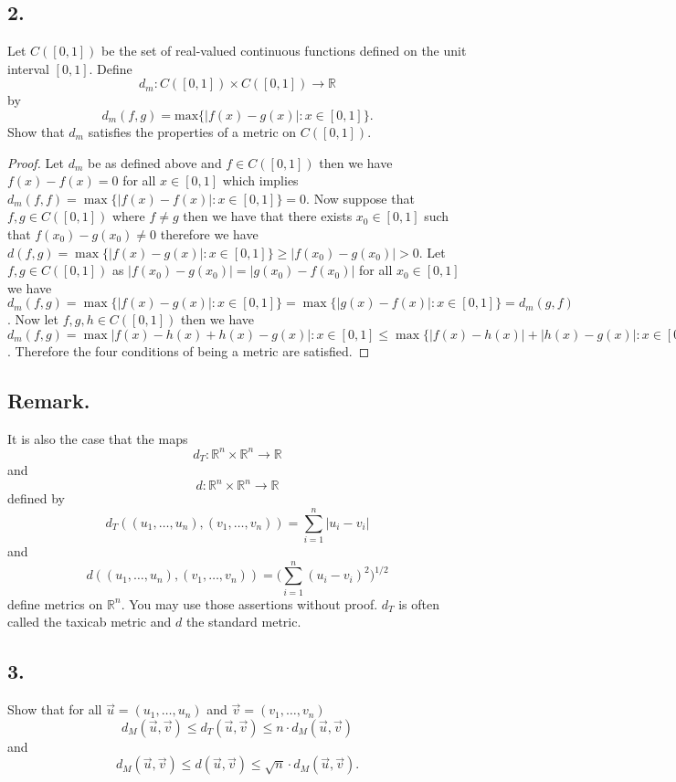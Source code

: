 \documentclass{amsart}
\theoremstyle{plain}
\theoremstyle{definition}
\theoremstyle{remark}
\begin{document}
\noindent
\subsection*{2.} Let $C([0,1])$ be the set of real-valued continuous functions defined on the unit interval $[0,1]$. Define
\[
    d_m : C([0,1]) \times C([0,1]) \rightarrow \mathbb R
\]
by
\[
    d_m (f,g) = \mbox{max}\{ |f(x)-g(x)| : x\in [0,1]\} .
\]
\noindent
Show that $d_m$ satisfies the properties of a metric on $C([0,1])$.

\vspace{.15in}

\begin{proof}
    Let $d_m$ be as defined above and $f\in C([0,1])$ then we have $f(x)-f(x)=0$ for all $x\in [0,1]$ which implies $d_m(f,f)=\max\{|f(x)-f(x)|:x\in [0,1]\}=0$. Now suppose that $f,g\in C([0,1])$ where $f\not = g$ then we have that there exists $x_0\in [0,1]$ such that $f(x_0)-g(x_0) \not = 0$ therefore we have $d(f,g)=\max\{|f(x)-g(x)|:x\in [0,1]\}\geq |f(x_0)-g(x_0)|>0$. Let $f,g\in C([0,1])$ as $|f(x_0)-g(x_0)|=|g(x_0)-f(x_0)|$ for all $x_0\in [0,1]$ we have $d_m(f,g)=\max\{|f(x)-g(x)|:x\in [0,1]\}=\max\{|g(x)-f(x)|:x\in [0,1]\}=d_m(g,f)$. Now let $f,g,h\in C([0,1])$ then we have $d_m(f,g)=\max{|f(x)-h(x)+h(x)-g(x)|: x\in [0,1]}\leq \max\{|f(x)-h(x)|+|h(x)-g(x)|:x\in [0,1]\}\leq \max\{|f(x)-h(x)|:x\in [0,1]\}+\max\{|h(x)-g(x)|:x\in [0,1]\}= d_m(f,h)+d_m(h,g)$. Therefore the four conditions of being a metric are satisfied.
\end{proof}


\noindent
\subsection*{Remark.} It is also the case that the maps
\[
    d_T : \mathbb R ^n \times \mathbb R ^n \rightarrow \mathbb R
\]
and
\[
    d : \mathbb R ^n \times \mathbb R ^n \rightarrow \mathbb R
\]
defined by
\[
    d_T( (u_1, \ldots , u_n) , (v_1, \ldots , v_n )) = \sum _{i=1}^n |u_i - v_i|
\]
and
\[
    d( (u_1, \ldots , u_n) , (v_1, \ldots , v_n )) = \big( \sum  _{i=1}^n (u_i - v_i)^2 \big) ^{1/2}
\]
define metrics on $\mathbb R ^n$. You may use those assertions without proof. $d_T$ is often called the taxicab metric and $d$ the standard metric.

\vspace{.15in}

\noindent
\subsection*{3.}  Show that for all $\vec{u} = (u_1, \ldots , u_n)$ and $\vec{v} = (v_1, \ldots , v_n )$
\[
    d_M (\vec{u} , \vec{v} ) \le d_T (\vec{u} , \vec{v} ) \le n\cdot d_M (\vec{u} , \vec{v} )
\]
and
\[
    d_M (\vec{u} , \vec{v} ) \le d (\vec{u} , \vec{v} ) \le \sqrt{n}\cdot d_M (\vec{u} , \vec{v} ).
\]
\end{document}
